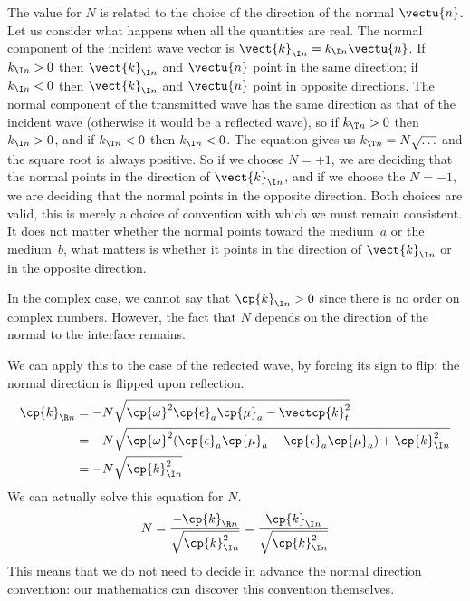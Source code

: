The value for $N$ is related to the choice of the direction of the normal $\vectu{n}$.
Let us consider what happens when all the quantities are real.
The normal component of the incident wave vector is $\vect{k}_{\I n}=k_{\I n}\vectu{n}$.
If $k_{\I n}>0$ then $\vect{k}_{\I n}$ and $\vectu{n}$ point in the same direction;
if $k_{\I n}<0$ then $\vect{k}_{\I n}$ and $\vectu{n}$ point in opposite directions.
The normal component of the transmitted wave has the same direction as that of the incident wave (otherwise it would be a reflected wave),
so if $k_{\T n}>0$ then $k_{\I n}>0$, and if $k_{\T n}<0$ then $k_{\I n}<0$.
The equation gives us $k_{\T n} = N\sqrt{\ldots}$ and the square root is always positive.
So if we choose $N=+1$, we are deciding that the normal points in the direction of $\vect{k}_{\I n}$, and if we choose the $N=-1$, we are deciding that the normal points in the opposite direction.
Both choices are valid, this is merely a choice of convention with which we must remain consistent.
It does not matter whether the normal points toward the medium~$a$ or the medium~$b$, what matters is whether it points in the direction of $\vect{k}_{\I n}$ or in the opposite direction.

In the complex case, we cannot say that $\cp{k}_{\I n}>0$ since there is no order on complex numbers.
However, the fact that $N$ depends on the direction of the normal to the interface remains.

We can apply this to the case of the reflected wave, by forcing its sign to flip: the normal direction is flipped upon reflection.
\begin{subequations}
\begin{align}
    \cp{k}_{\R n}
    &= -N \sqrt{\cp{\omega}^2 \cp{\epsilon}_a \cp{\mu}_a - \vectcp{k}_t^2}
    \\
    &= -N \sqrt{\cp{\omega}^2 (\cp{\epsilon}_a \cp{\mu}_a - \cp{\epsilon}_a \cp{\mu}_a) + \cp{k}_{\I n}^2}
    \\
    &= -N \sqrt{\cp{k}_{\I n}^2}
\end{align}
\end{subequations}
We can actually solve this equation for $N$.
\begin{equation}
    N =
    \frac{-\cp{k}_{\R n}}{\sqrt{\cp{k}_{\I n}^2}} =
    \frac{ \cp{k}_{\I n}}{\sqrt{\cp{k}_{\I n}^2}}
\end{equation}
This means that we do not need to decide in advance the normal direction convention: our mathematics can discover this convention themselves.

